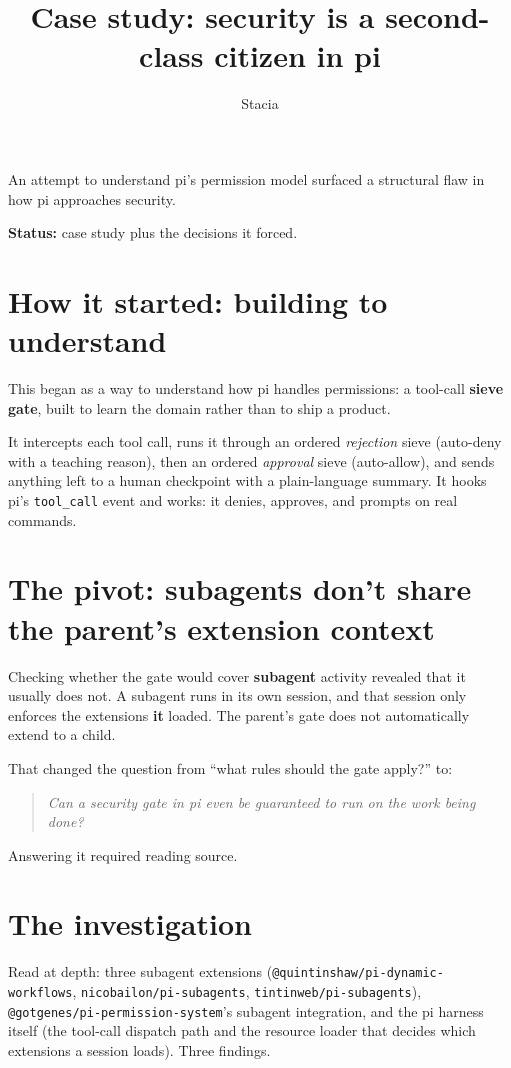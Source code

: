 \documentclass[11pt]{article}
\title{Case study: security is a second-class citizen in pi}
\author{Stacia}
\date{}
\newcommand{\code}[1]{\texttt{#1}}
\newenvironment{pullquote}
  {\begin{quote}\itshape}
  {\end{quote}}
\begin{document}
\maketitle

\noindent An attempt to understand pi's permission model surfaced a structural
flaw in how pi approaches security.

\medskip
\noindent\textbf{Status:} case study plus the decisions it forced.

\section*{How it started: building to understand}

This began as a way to understand how pi handles permissions: a tool-call
\textbf{sieve gate}, built to learn the domain rather than to ship a product.

It intercepts each tool call, runs it through an ordered \emph{rejection} sieve
(auto-deny with a teaching reason), then an ordered \emph{approval} sieve
(auto-allow), and sends anything left to a human checkpoint with a plain-language
summary. It hooks pi's \code{tool\_call} event and works: it denies, approves,
and prompts on real commands.

\section*{The pivot: subagents don't share the parent's extension context}

Checking whether the gate would cover \textbf{subagent} activity revealed that it
usually does not. A subagent runs in its own session, and that session only
enforces the extensions \textbf{it} loaded. The parent's gate does not
automatically extend to a child.

That changed the question from ``what rules should the gate apply?'' to:

\begin{pullquote}
Can a security gate in pi even be \emph{guaranteed to run} on the work being done?
\end{pullquote}

Answering it required reading source.

\section*{The investigation}

Read at depth: three subagent extensions (\code{@quintinshaw/pi-dynamic-workflows},
\code{nicobailon/pi-subagents}, \code{tintinweb/pi-subagents}),
\code{@gotgenes/pi-permission-system}'s subagent integration, and the pi harness
itself (the tool-call dispatch path and the resource loader that decides which
extensions a session loads). Three findings.
\end{document}
